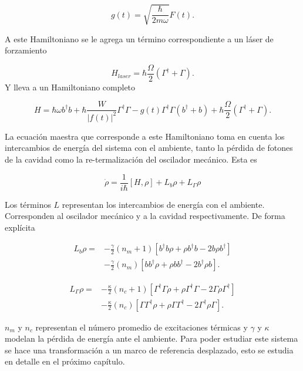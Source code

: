\documentclass[10pt,a4paper]{report}
\begin{document}
\begin{equation}
g(t) = \sqrt{\frac{\hbar}{2m\omega}}F(t).
\end{equation}

A este Hamiltoniano se le agrega un término correspondiente a un láser de forzamiento

\begin{equation}
H_{laser}= \hbar \frac{\Omega}{2}(\Gamma^\dagger + \Gamma).
\end{equation} Y lleva a un Hamiltoniano completo

\begin{equation}
H = \hbar \omega b^\dagger b + \hbar\frac{ W}{|f(t)|^2}\Gamma^\dagger \Gamma -g(t)\Gamma^\dagger \Gamma(b^\dagger + b) + \hbar \frac{\Omega}{2}(\Gamma^\dagger + \Gamma).
\end{equation}

 La ecuación maestra que corresponde a este Hamiltoniano toma en cuenta los intercambios de energía del sistema con el ambiente, tanto la pérdida de fotones de la cavidad como la re-termalización del oscilador mecánico. Esta es \cite{BarberisLC}

\begin{equation} \label{LCMasterEquation}
\dot{\rho} = \frac{1}{i\hbar}[H,\rho] +L_b\rho + L_\Gamma \rho
\end{equation}

Los términos $L$ representan los intercambios de energía con el ambiente. Corresponden al oscilador mecánico y a la cavidad respectivamente. De forma explícita

\begin{align}
L_b \rho =& - \frac{\gamma}{2}(n_m + 1)[b^\dagger b\rho + \rho b^\dagger b -2b\rho b^\dagger]  \\
 &- \frac{\gamma}{2}(n_m)[ bb^\dagger\rho + \rho  bb^\dagger -2b^\dagger\rho b].\nonumber
\end{align} 

\begin{align}
L_\Gamma \rho =& - \frac{\kappa}{2}(n_c + 1)[\Gamma^\dagger \Gamma\rho + \rho \Gamma^\dagger \Gamma -2\Gamma\rho \Gamma^\dagger]  \\
 &- \frac{\kappa}{2}(n_c)[ \Gamma\Gamma^\dagger\rho + \rho  \Gamma\Gamma^\dagger -2\Gamma^\dagger\rho \Gamma].\nonumber
\end{align}

$n_m$ y $n_c$ representan el número promedio de excitaciones térmicas y $\gamma$ y $\kappa$ modelan la pérdida de energía ante el ambiente. Para poder estudiar este sistema se hace una transformación a  un marco de referencia desplazado, esto se estudia en detalle en el próximo capítulo.
\end{document}
